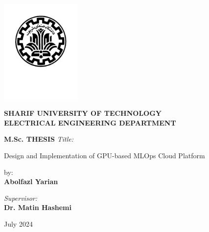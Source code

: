\thispagestyle{empty}

\begin{latin}
\centering
\vspace*{-2.5cm}
\includegraphics[width=4cm]{Sharif_Logo.pdf}
\vspace*{-1.5cm}

{\large \bf SHARIF UNIVERSITY OF TECHNOLOGY} \\
{\bf ELECTRICAL ENGINEERING DEPARTMENT}

\vspace{2cm}

{\large \bf M.Sc. THESIS}
\vskip 1cm
{\sl Title:}\\

\baselineskip
{\huge \bf 

Design and Implementation of GPU-based MLOps Cloud Platform
}\par

\vfil

by:\\
\vspace{-2mm}
{\large \bf Abolfazl Yarian}

\vfil

{\sl Supervisor:}\\
\vspace{-1mm}
{\large \bf Dr. Matin Hashemi \\}




\vfil

{July 2024}
\par
\end{latin}

